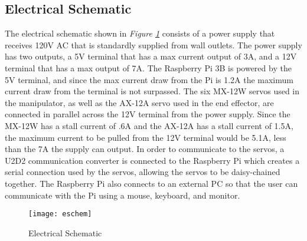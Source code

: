 \subsection{Electrical Schematic}
The electrical schematic shown in \emph{Figure \ref{fig:eschem}} consists of a power supply that receives 120V AC that is standardly supplied from wall outlets. The power supply has two outputs, a 5V terminal that has a max current output of 3A, and a 12V terminal that has a max output of 7A. The Raspberry Pi 3B is powered by the 5V terminal, and since the max current draw from the Pi is 1.2A the maximum current draw from the terminal is not surpassed. The six MX-12W servos used in the manipulator, as well as the AX-12A servo used in the end effector, are connected in parallel across the 12V terminal from the power supply. Since the MX-12W has a stall current of .6A and the AX-12A has a stall current of 1.5A, the maximum current to be pulled from the 12V terminal would be 5.1A, less than the 7A the supply can output. In order to communicate to the servos, a U2D2 communication converter is connected to the Raspberry Pi which creates a serial connection used by the servos, allowing the servos to be daisy-chained together. The Raspberry Pi also connects to an external PC so that the user can communicate with the Pi using a mouse, keyboard, and monitor.
\vfill
\begin{figure}[htp]
  \centering
  \texttt{[image: eschem]}
  \caption{Electrical Schematic}
  \label{fig:eschem}
\end{figure}
\vfill\null
\newpage
